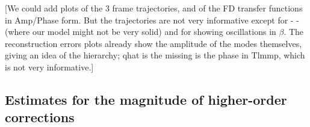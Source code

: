 \documentclass[aps,showpacs,twocolumn,
prd,superscriptaddress,nofootinbib]{revtex4-1}
\newcommand\calT{{\mathcal{T}}}
\newcommand{\SM}[1]{{\color{Red} #1}}
\begin{document}

\SM{[We could add plots of the 3 frame trajectories, and of the FD transfer functions in Amp/Phase form. But the trajectories are not very informative except for - - (where our model might not be very solid) and for showing oscillations in $\beta$. The reconstruction errors plots already show the amplitude of the modes themselves, giving an idea of the hierarchy; qhat is the missing is the phase in Tlmmp, which is not very informative.]}



\subsection{Estimates for the magnitude of higher-order corrections}
\label{subsec:sizecorrPrec}
\end{document}
